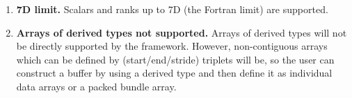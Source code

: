 

\begin{enumerate}

\item {\bf 7D limit.}  Scalars and ranks up to 7D (the Fortran limit) are 
supported.

\item {\bf Arrays of derived types not supported.}  Arrays of derived 
types will not be directly supported by the framework.
However, non-contiguous arrays which can be defined by (start/end/stride)
triplets will be, so the user can construct a buffer by using a derived
type and then define it as individual data arrays or a packed bundle array.

\end{enumerate}